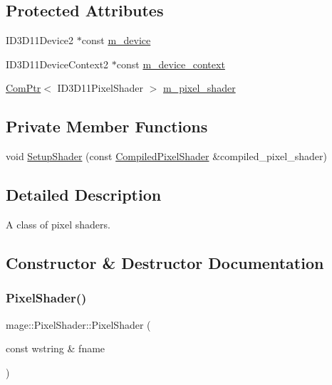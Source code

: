\subsection*{Protected Attributes}
\begin{DoxyCompactItemize}
\item 
I\+D3\+D11\+Device2 $\ast$const \hyperlink{classmage_1_1_pixel_shader_a7fa34f27d8f39db2403edac28ddecc68}{m\+\_\+device}
\item 
I\+D3\+D11\+Device\+Context2 $\ast$const \hyperlink{classmage_1_1_pixel_shader_a6b9bbf18f255b061fb75453f32a78720}{m\+\_\+device\+\_\+context}
\item 
\hyperlink{namespacemage_ae74f374780900893caa5555d1031fd79}{Com\+Ptr}$<$ I\+D3\+D11\+Pixel\+Shader $>$ \hyperlink{classmage_1_1_pixel_shader_a1dd0f87be1c1f7fe5a1bb2737263222f}{m\+\_\+pixel\+\_\+shader}
\end{DoxyCompactItemize}
\subsection*{Private Member Functions}
\begin{DoxyCompactItemize}
\item 
void \hyperlink{classmage_1_1_pixel_shader_a3010aefe86be3e1efaf2f1c010c42a48}{Setup\+Shader} (const \hyperlink{structmage_1_1_compiled_pixel_shader}{Compiled\+Pixel\+Shader} \&compiled\+\_\+pixel\+\_\+shader)
\end{DoxyCompactItemize}


\subsection{Detailed Description}
A class of pixel shaders. 

\subsection{Constructor \& Destructor Documentation}
\hypertarget{classmage_1_1_pixel_shader_aceac0769412c88171ca85503165a85c0}{}\label{classmage_1_1_pixel_shader_aceac0769412c88171ca85503165a85c0} 
\subsubsection{\texorpdfstring{Pixel\+Shader()}{PixelShader()}\hspace{0.1cm}{\footnotesize\ttfamily [1/6]}}
{\footnotesize\ttfamily mage\+::\+Pixel\+Shader\+::\+Pixel\+Shader (\begin{DoxyParamCaption}\item[{const wstring \&}]{fname }\end{DoxyParamCaption})\hspace{0.3cm}{\ttfamily [explicit]}}

